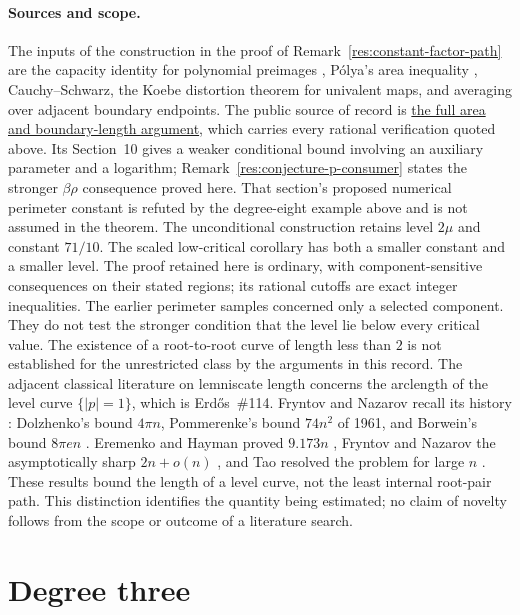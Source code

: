 \paragraph{Sources and scope.}
\label{bdry:constant-factor}
The inputs of the construction in the proof of
Remark~\ref{res:constant-factor-path} are the capacity identity for polynomial
preimages \cite[\S2]{crane}, P\'olya's area inequality \cite[Theorem~1]{crane},
Cauchy--Schwarz, the Koebe distortion theorem for univalent maps, and
averaging over adjacent boundary endpoints.  The public source
of record is
\href{https://github.com/wcook04/plectis-erdos/blob/f214a6b45528dc5eefe20ffadc35f2e981627d4c/research_corpus/Erdos1041/UnconditionalConstantFactorBound.md}{the full area and boundary-length argument}, which
carries every rational verification quoted above. Its Section~10 gives
a weaker conditional bound involving an auxiliary parameter and a
logarithm; Remark~\ref{res:conjecture-p-consumer} states the stronger
$\beta\rho$ consequence proved here. That section's proposed numerical
perimeter constant is refuted by the degree-eight example above and is
not assumed in the theorem. The unconditional construction retains
level $2\mu$ and constant $71/10$.
The scaled low-critical corollary has both a smaller constant and a smaller
level.  The proof retained here is ordinary, with component-sensitive
consequences on their stated regions; its rational cutoffs are exact integer
inequalities.  The earlier perimeter samples concerned only a selected component.
They do not test the stronger condition that the level lie below every
critical value.
The existence of a root-to-root curve of length less than $2$ is not established for the unrestricted
class by the arguments in this record.
The adjacent classical literature on
lemniscate length concerns the arclength of the level curve $\{|p|=1\}$, which
is Erd\H{o}s~\#114.  Fryntov and Nazarov recall its history
\cite[Introduction]{fryntovnazarov2008}: Dolzhenko's bound $4\pi n$,
Pommerenke's bound $74n^2$ of 1961, and Borwein's bound $8\pi en$
\cite{borwein1995}.  Eremenko and Hayman proved $9.173n$
\cite[Theorem~1]{eremenkohayman1999}, Fryntov and Nazarov the asymptotically
sharp $2n+o(n)$ \cite{fryntovnazarov2008}, and Tao resolved the problem for
large $n$ \cite{tao2025}.  These results bound the length of a level curve, not the least internal
root-pair path.  This distinction identifies the quantity being estimated;
no claim of novelty follows from the scope or outcome of a literature search.

\section{Degree three}
\label{sec:degree-three}

